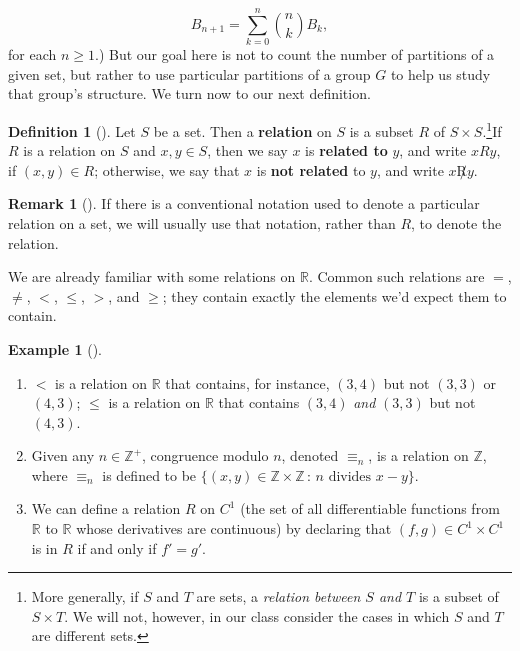 \documentclass[10pt,]{book}
\newcommand{\terminology}[1]{\textbf{#1}}
\theoremstyle{plain}
\theoremstyle{definition}
\newtheorem{definition}[theorem]{Definition}
\theoremstyle{definition}
\newtheorem{remark}[theorem]{Remark}
\theoremstyle{definition}
\newtheorem{example}[theorem]{Example}
\theoremstyle{definition}
\numberwithin{equation}{section}
\def\Z{\mathbb{Z}}
\def\R{\mathbb{R}}
\newcommand{\lt}{<}
\begin{document}
\begin{equation*}
B_{n+1}=\sum_{k=0}^n \binom{n}{k} B_k,
\end{equation*}
for each \(n\geq 1\).) But our goal here is not to count the number of partitions of a given set, but rather to use particular partitions of a group \(G\) to help us study that group's structure. We turn now to our next definition.%
\begin{definition}[{}]\label{definition-57}
\label{notation-63}
\label{notation-64}
Let \(S\) be a set. Then a \terminology{relation} on \(S\) is a subset \(R\) of \(S\times S\).\footnote{More generally, if \(S\) and \(T\) are sets, a \emph{relation between \(S\) and \(T\)} is a subset of \(S \times T\). We will not, however, in our class consider the cases in which \(S\) and \(T\) are different sets.\label{fn-2}}If \(R\) is a relation on \(S\) and \(x,y\in S\), then we say \(x\) is \terminology{related to} \(y\), and write \(x R y\), if \((x,y)\in R\); otherwise, we say that \(x\) is \terminology{not related} to \(y\), and write \(x \not R y\).%
\end{definition}
\begin{remark}[]\label{remark-34}
If there is a conventional notation used to denote a particular relation on a set, we will usually use that notation, rather than \(R\), to denote the relation.%
\end{remark}
We are already familiar with some relations on \(\R\). Common such relations are \(=\), \(\neq\), \(\lt\), \(\leq\), \(>\), and \(\geq\); they contain exactly the elements we'd expect them to contain.%
\begin{example}[]\label{example-65}
\leavevmode%
\begin{enumerate}
\item\hypertarget{li-388}{}\(\lt\) is a relation on \(\R\) that contains, for instance, \((3,4)\) but not \((3,3)\) or \((4,3)\); \(\leq\) is a relation on \(\R\) that contains \((3,4)\) \emph{and} \((3,3)\) but not \((4,3)\).%
\item\hypertarget{li-389}{}Given any \(n\in \Z^+\), congruence modulo \(n\), denoted \(\equiv_n\), is a relation on \(\Z\), where \(\equiv_n\) is defined to be \(\{(x,y) \in \Z
\times \Z \,:\, n \text{ divides } x-y\}\).%
\item\hypertarget{li-390}{}We can define a relation \(R\) on \(C^1\) (the set of all differentiable functions from \(\R\) to \(\R\) whose derivatives are continuous) by declaring that \((f,g)\in C^1 \times C^1\) is in \(R\) if and only if \(f'=g'\).%
\end{enumerate}
%
\end{example}
\end{document}
